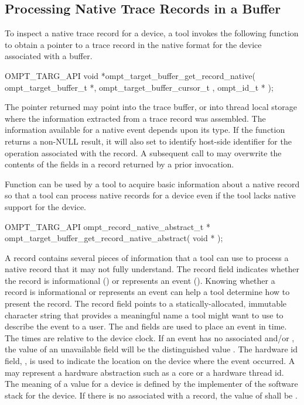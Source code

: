 \documentclass{article}
\begin{document}
\subsection{Processing Native Trace Records in a Buffer}
\label{sec:native-record-data}

To inspect a native trace record for a device, a tool invokes the following function to obtain a pointer to a trace record in the native format for the device associated with a buffer. \begin{boxedcode}
OMPT\_TARG\_API void *ompt\_target\_buffer\_get\_record\_native(
  ompt\_target\_buffer\_t *, 
  ompt\_target\_buffer\_cursor\_t ,
  ompt\_id\_t *
);
\end{boxedcode}
The pointer returned  may point into the trace buffer, or into thread local storage where the information extracted from a trace record was assembled. The information available for a native event depends upon its type. If the function returns a non-NULL result, it will also set  to identify host-side identifier for the operation associated with the record.
A subsequent call to  may overwrite the contents of the fields in a record returned by a prior invocation.

Function   can be
used by a tool to acquire basic information about a native record 
so that a tool can process native records for a device even if the
tool lacks native support for the device. 
\begin{boxedcode}
OMPT\_TARG\_API ompt\_record\_native\_abstract\_t *
ompt\_target\_buffer\_get\_record\_native\_abstract(
  void * 
);

\end{boxedcode}
A   record contains several pieces of information that a tool can use to process a native record that it may not fully understand. The record  field indicates whether the record is informational () or represents an event (). Knowing whether a record is informational or represents an event can help a tool determine how to present the record. The record   field points to a statically-allocated, immutable character string that provides  a meaningful name  a tool might want to use to describe the event to a user. The  and  fields are used to place an event in time. The times are relative to the device clock. If an event has no associated  and/or , the value of an unavailable field will be the distinguished value . The hardware id field, ,  is used to indicate the location on the device where the event occurred. A  may represent a hardware abstraction such as a core or a hardware thread id. The meaning of a  value for a device is defined by the implementer of the software stack for the device. If there is no  associated with a record, the value of  shall be . 
\end{document}
